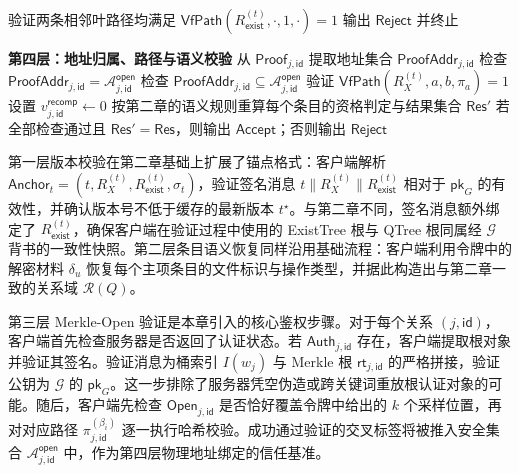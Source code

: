 \begin{breakablealgorithm}
\begin{algorithmic}[1]
    \STATE 验证两条相邻叶路径均满足 $\mathsf{VfPath}(R_{\mathsf{exist}}^{(t)},\cdot,1,\cdot)=1$
      \STATE 输出 $\mathsf{Reject}$ 并终止
    \ENDIF
  \ENDIF
\ENDFOR
\item[] \textbf{第四层：地址归属、路径与语义校验}
    \STATE 从 $\mathsf{Proof}_{j,\mathsf{id}}$ 提取地址集合 $\mathsf{ProofAddr}_{j,\mathsf{id}}$
      \STATE 检查 $\mathsf{ProofAddr}_{j,\mathsf{id}}=\mathcal{A}_{j,\mathsf{id}}^{\mathsf{open}}$
    \ELSE
      \STATE 检查 $\mathsf{ProofAddr}_{j,\mathsf{id}}\subseteq \mathcal{A}_{j,\mathsf{id}}^{\mathsf{open}}$
    \ENDIF
      \STATE 验证 $\mathsf{VfPath}(R_X^{(t)},a,b,\pi_a)=1$
    \ENDFOR
  \ELSE
    \STATE 设置 $v_{j,\mathsf{id}}^{\mathsf{recomp}}\leftarrow 0$
  \ENDIF
\ENDFOR
\STATE 按第二章的语义规则重算每个条目的资格判定与结果集合 $\mathsf{Res}'$
\STATE 若全部检查通过且 $\mathsf{Res}'=\mathsf{Res}$，则输出 $\mathsf{Accept}$；否则输出 $\mathsf{Reject}$
\end{algorithmic}
\end{breakablealgorithm}

第一层版本校验在第二章基础上扩展了锚点格式：客户端解析 $\mathsf{Anchor}_t=(t,R_X^{(t)},R_{\mathsf{exist}}^{(t)},\sigma_t)$，验证签名消息 $t\|R_X^{(t)}\|R_{\mathsf{exist}}^{(t)}$ 相对于 $\mathsf{pk}_G$ 的有效性，并确认版本号不低于缓存的最新版本 $t^\star$。与第二章不同，签名消息额外绑定了 $R_{\mathsf{exist}}^{(t)}$，确保客户端在验证过程中使用的 ExistTree 根与 QTree 根同属经 $\mathcal{G}$ 背书的一致性快照。第二层条目语义恢复同样沿用基础流程：客户端利用令牌中的解密材料 $\delta_u$ 恢复每个主项条目的文件标识与操作类型，并据此构造出与第二章一致的关系域 $\mathcal{R}(Q)$。

第三层 Merkle-Open 验证是本章引入的核心鉴权步骤。对于每个关系 $(j,\mathsf{id})$，客户端首先检查服务器是否返回了认证状态。若 $\mathsf{Auth}_{j,\mathsf{id}}$ 存在，客户端提取根对象并验证其签名。验证消息为桶索引 $I(w_j)$ 与 Merkle 根 $\mathsf{rt}_{j,\mathsf{id}}$ 的严格拼接，验证公钥为 $\mathcal{G}$ 的 $\mathsf{pk}_G$。这一步排除了服务器凭空伪造或跨关键词重放根认证对象的可能。随后，客户端先检查 $\mathsf{Open}_{j,\mathsf{id}}$ 是否恰好覆盖令牌中给出的 $k$ 个采样位置，再对对应路径 $\pi_{j,\mathsf{id}}^{(\beta_i)}$ 逐一执行哈希校验。成功通过验证的交叉标签将被推入安全集合 $\mathcal{A}_{j,\mathsf{id}}^{\mathsf{open}}$ 中，作为第四层物理地址绑定的信任基准。

